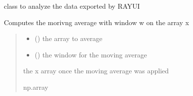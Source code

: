 \documentclass[letterpaper,10pt,english]{sphinxmanual}
\begin{document}
\begin{fulllineitems}
\label{\detokenize{API:raypyng.postprocessing.PostProcessAnalyzed}}
\pysigstartsignatures
{}
\pysigstopsignatures
\sphinxAtStartPar
class to analyze the data exported by RAY\sphinxhyphen{}UI

\begin{fulllineitems}
\label{\detokenize{API:raypyng.postprocessing.PostProcessAnalyzed.moving_average}}
\pysigstartsignatures
{}
\pysigstopsignatures
\sphinxAtStartPar
Computes the morivng average with window w on the array x
\begin{quote}\begin{description}
\begin{itemize}
\item {} 
\sphinxAtStartPar
{} () \textendash{} the array to average

\item {} 
\sphinxAtStartPar
{} () \textendash{} the window for the moving average

\end{itemize}

\sphinxAtStartPar
the x array once the moving average was applied

\sphinxAtStartPar
np.array

\end{description}\end{quote}

\end{fulllineitems}



\end{fulllineitems}
\end{document}
